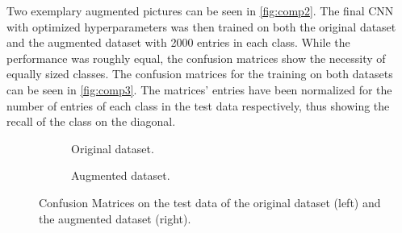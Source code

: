 \noindent
Two exemplary augmented pictures can be seen in \autoref{fig:comp2}. The final CNN with optimized hyperparameters was then trained on both the original dataset and the augmented dataset with 2000 entries in each class. While the performance was roughly equal, the confusion matrices show the necessity of equally sized classes.
The confusion matrices for the training on both datasets can be seen in \autoref{fig:comp3}. The matrices' entries have been normalized for the number of entries of each class in the test data respectively, thus showing the recall of the class on the diagonal.
\begin{figure}[H]
    \centering
    \begin{subfigure}{0.49\textwidth}
        \centering
        \caption{Original dataset.}
    \end{subfigure}
    \hfill
    \begin{subfigure}{0.49\textwidth}
        \centering
        \caption{Augmented dataset.}
    \end{subfigure}
    \caption{Confusion Matrices on the test data of the original dataset (left) and the augmented dataset (right).}
    \label{fig:comp3}
\end{figure}
